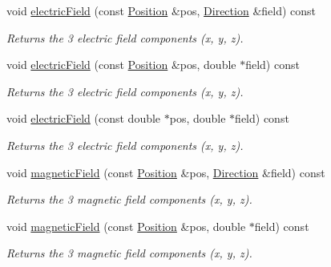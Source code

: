 \begin{DoxyCompactItemize}
void \hyperlink{class_d_d4hep_1_1_geometry_1_1_overlayed_field_a4b87593d18f3b7c4a675231a0a978dba}{electricField} (const \hyperlink{namespace_d_d4hep_1_1_geometry_a55083902099d03506c6db01b80404900}{Position} \&pos, \hyperlink{namespace_d_d4hep_1_1_geometry_a56730a0ddb9f3f089c415cd693bd7c19}{Direction} \&field) const 
\begin{DoxyCompactList}\small\item\em Returns the 3 electric field components (x, y, z). \item\end{DoxyCompactList}\item 
void \hyperlink{class_d_d4hep_1_1_geometry_1_1_overlayed_field_a12a09e1c0e21fb6cbbfc80b252a010c2}{electricField} (const \hyperlink{namespace_d_d4hep_1_1_geometry_a55083902099d03506c6db01b80404900}{Position} \&pos, double $\ast$field) const 
\begin{DoxyCompactList}\small\item\em Returns the 3 electric field components (x, y, z). \item\end{DoxyCompactList}\item 
void \hyperlink{class_d_d4hep_1_1_geometry_1_1_overlayed_field_adf8eafcce3969010f3f8d39f9e09b3a9}{electricField} (const double $\ast$pos, double $\ast$field) const 
\begin{DoxyCompactList}\small\item\em Returns the 3 electric field components (x, y, z). \item\end{DoxyCompactList}\item 
void \hyperlink{class_d_d4hep_1_1_geometry_1_1_overlayed_field_a7f94edbcb2a607da89c5ceca9167e900}{magneticField} (const \hyperlink{namespace_d_d4hep_1_1_geometry_a55083902099d03506c6db01b80404900}{Position} \&pos, \hyperlink{namespace_d_d4hep_1_1_geometry_a56730a0ddb9f3f089c415cd693bd7c19}{Direction} \&field) const 
\begin{DoxyCompactList}\small\item\em Returns the 3 magnetic field components (x, y, z). \item\end{DoxyCompactList}\item 
void \hyperlink{class_d_d4hep_1_1_geometry_1_1_overlayed_field_afa24afd69fe7a4f1730ee4d14b2e9559}{magneticField} (const \hyperlink{namespace_d_d4hep_1_1_geometry_a55083902099d03506c6db01b80404900}{Position} \&pos, double $\ast$field) const 
\begin{DoxyCompactList}\small\item\em Returns the 3 magnetic field components (x, y, z). \item\end{DoxyCompactList}\item 

\end{DoxyCompactItemize}
